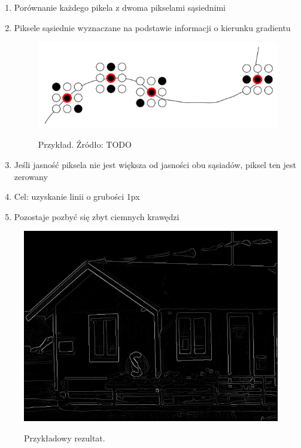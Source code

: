 \documentclass[a4paper,twocolumn,12pt]{article}
\begin{document}
\begin{enumerate}
 \item Porównanie każdego pikela z dwoma pikselami sąsiednimi
 \item Piksele sąsiednie wyznaczane na podstawie informacji o kierunku gradientu
 
  \begin{figure}[!ht]
   \begin{center}
    \scalebox{0.25}
    {
     \includegraphics{../obrazki/canny/3_1_piksele.png}
    }
   \end{center}
   \caption{
    Przykład.
    Źródło: TODO
   }
   \label{fig:canny_adjacent_pixels}
  \end{figure}

 \item Jeśli jasność piksela nie jest większa od jasności obu sąsiadów, piksel ten jest zerowany
 \item Cel: uzyskanie linii o grubości 1px
 \item Pozostaje pozbyć się zbyt ciemnych krawędzi
\end{enumerate}

\begin{figure}[!ht]
 \begin{center}
  \scalebox{0.25}
  {
   \includegraphics{../obrazki/canny/3_2_krawedzie.png}
  }
 \end{center}
 \caption{
  Przykładowy rezultat.
 }
 \label{fig:canny_redundant_pixels_removal}
\end{figure}
\end{document}

